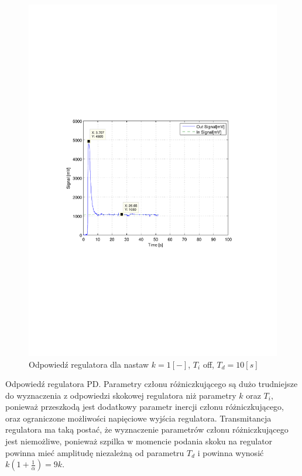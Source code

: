 \documentclass[12pt]{article}
\begin{document}
\newpage

\begin{figure}[!htb]
	\begin{center}
		\includegraphics[width=15cm,trim=3cm 9cm 3cm 9cm,clip]
		{../res/img/cont_1_0_10.pdf}
	\end{center} 
	\caption{Odpowiedź regulatora dla nastaw $k=1[-]$, $T_i$ off, $T_d=10[s]$}
\end{figure}

Odpowiedź regulatora PD. Parametry członu różniczkującego są dużo trudniejsze do
wyznaczenia z odpowiedzi skokowej regulatora niż parametry $k$ oraz $T_i$,
ponieważ przeszkodą jest dodatkowy parametr inercji członu różniczkującego, oraz
ograniczone możliwości napięciowe wyjścia regulatora. Transmitancja regulatora
ma taką postać, że wyznaczenie parametrów członu różniczkującego jest
niemożliwe, ponieważ szpilka w momencie podania skoku na regulator powinna mieć
amplitudę niezależną od parametru $T_d$ i powinna wynosić
$k(1+\frac{1}{\alpha})=9k$.
\end{document}
